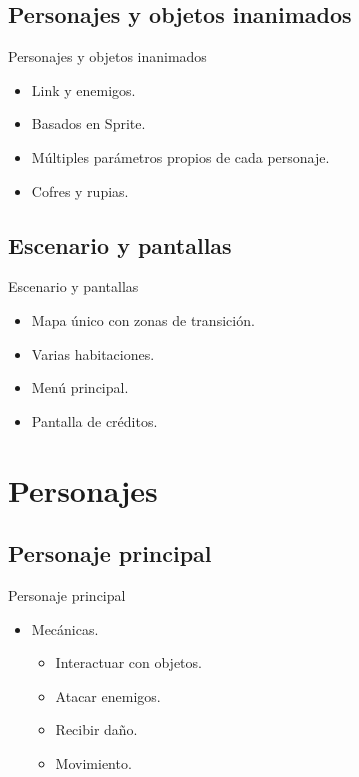 \documentclass{beamer}
\begin{document}
\subsection{Personajes y objetos inanimados}

\begin{frame}{Personajes y objetos inanimados}
	\begin{itemize}
		\item Link y enemigos.
		\item Basados en Sprite.
		\item Múltiples parámetros propios de cada personaje.
		\item Cofres y rupias.
	\end{itemize}
\end{frame}

\subsection{Escenario y pantallas}

\begin{frame}{Escenario y pantallas}
	\begin{itemize}
		\item Mapa único con zonas de transición.
		\item Varias habitaciones.
		\item Menú principal.
		\item Pantalla de créditos.
	\end{itemize}
\end{frame}

\section{Personajes}

\subsection{Personaje principal}

\begin{frame}{Personaje principal}
	\begin{itemize}
		\item Mecánicas.
		      \begin{itemize}
			      \item Interactuar con objetos.
			      \item Atacar enemigos.
			      \item Recibir daño.
			      \item Movimiento.
		      \end{itemize}
	\end{itemize}
\end{frame}
\end{document}
